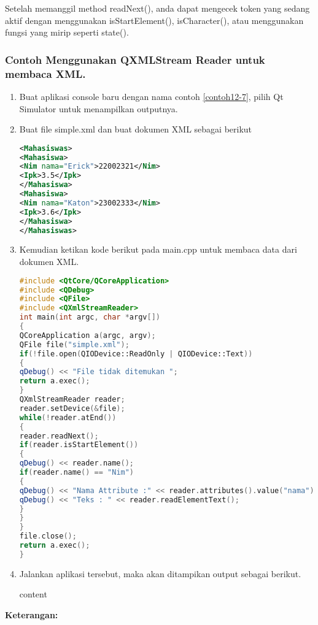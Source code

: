 Setelah memanggil method readNext(), anda dapat mengecek token yang
sedang aktif dengan menggunakan isStartElement(), isCharacter(), atau
menggunakan fungsi yang mirip seperti state().

\subsubsection*{Contoh  Menggunakan QXMLStream Reader untuk membaca XML.}

\begin{enumerate}
\item
  Buat aplikasi console baru dengan nama contoh \ref{contoh12-7}, pilih Qt Simulator
  untuk menampilkan outputnya.
\item
  Buat file simple.xml dan buat dokumen XML sebagai berikut

\begin{lstlisting}[language=xml]
<Mahasiswas>
<Mahasiswa>
<Nim nama="Erick">22002321</Nim>
<Ipk>3.5</Ipk>
</Mahasiswa>
<Mahasiswa>
<Nim nama="Katon">23002333</Nim>
<Ipk>3.6</Ipk>
</Mahasiswa>
</Mahasiswas>
\end{lstlisting}
\item
  Kemudian ketikan kode berikut pada main.cpp untuk membaca data dari
  dokumen XML.

\begin{lstlisting}[language=c++, caption=Menggunakan QXMLStream Reader untuk membaca XML, label=contoh12-8]
#include <QtCore/QCoreApplication>
#include <QDebug>
#include <QFile>
#include <QXmlStreamReader>
int main(int argc, char *argv[])
{
QCoreApplication a(argc, argv);
QFile file("simple.xml");
if(!file.open(QIODevice::ReadOnly | QIODevice::Text))
{
qDebug() << "File tidak ditemukan ";
return a.exec();
}
QXmlStreamReader reader;
reader.setDevice(&file);
while(!reader.atEnd())
{
reader.readNext();
if(reader.isStartElement())
{
qDebug() << reader.name();
if(reader.name() == "Nim")
{
qDebug() << "Nama Attribute :" << reader.attributes().value("nama");
qDebug() << "Teks : " << reader.readElementText();
}
}
}
file.close();
return a.exec();
}
\end{lstlisting}
\item
  Jalankan aplikasi tersebut, maka akan ditampikan output sebagai
  berikut.
  \begin{lcverbatim}
  	content
  \end{lcverbatim}
\end{enumerate}

\textbf{Keterangan:}

